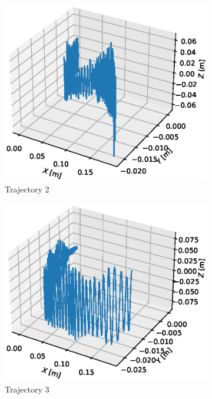\begin{figure}[H]
\begin{subfigure}{.5\textwidth}
\includegraphics[width=\linewidth]{Images/trajectory 2.eps}
\caption{Trajectory 2}
\end{subfigure}
\hfill
\begin{subfigure}{.5\textwidth}
\centering
\includegraphics[width=\linewidth]{Images/trajectory 3.eps}
\caption{Trajectory 3}
\end{subfigure}
\begin{subfigure}{.5\textwidth}
\centering


\end{subfigure}
\end{figure}
